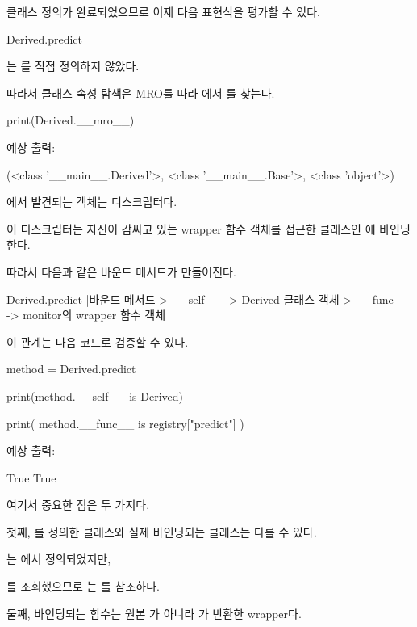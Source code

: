 클래스 정의가 완료되었으므로 이제 다음 표현식을 평가할 수 있다.

\begin{dhkcode}
Derived.predict
\end{dhkcode}

는 를 직접 정의하지 않았다.

따라서 클래스 속성 탐색은 MRO를 따라 에서 를 찾는다.

\begin{dhkcode}
print(Derived.__mro__)
\end{dhkcode}

예상 출력:

\begin{dhkzsh}
(<class '__main__.Derived'>, <class '__main__.Base'>, <class 'object'>)
\end{dhkzsh}

에서 발견되는 객체는  디스크립터다.

이 디스크립터는 자신이 감싸고 있는 wrapper 함수 객체를 접근한 클래스인 에 바인딩한다.

따라서 다음과 같은 바운드 메서드가 만들어진다.

\begin{dhkdir}[in=6]
Derived.predict
|바운드 메서드
> __self__ -> Derived 클래스 객체
> __func__ -> monitor의 wrapper 함수 객체
\end{dhkdir}

이 관계는 다음 코드로 검증할 수 있다.

\begin{dhkcode}
method = Derived.predict

print(method.__self__ is Derived)

print(
    method.__func__
    is registry["predict"]
)
\end{dhkcode}

예상 출력:

\begin{dhkzsh}
True
True
\end{dhkzsh}

여기서 중요한 점은 두 가지다.

첫째, 를 정의한 클래스와 실제 바인딩되는 클래스는 다를 수 있다.

는 에서 정의되었지만, 

를 조회했으므로  는  를 참조하다.

둘째, 바인딩되는 함수는 원본 가 아니라 가 반환한 wrapper다.

